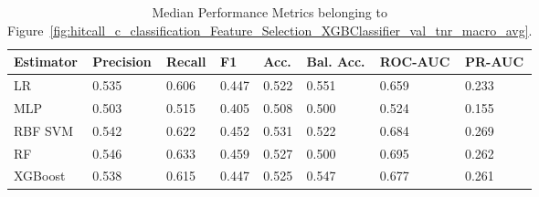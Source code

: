 \begin{longtable}{llllllll}
\caption{Median Performance Metrics belonging to Figure~\ref{fig:hitcall_c_classification_Feature_Selection_XGBClassifier_val_tnr_macro_avg}.}\label{tab:table:hitcall_c_classification_feature_selection_xgbclassifier_val_tnr_macro_avg}\\
\toprule
\midrule
\small Estimator & \small Precision & \small Recall & \small F1 & \small Acc. & \small Bal. Acc. & \small ROC-AUC & \small PR-AUC\\
\hline
LR & 0.535 & 0.606 & 0.447 & 0.522 & 0.551 & 0.659 & 0.233\\
MLP & 0.503 & 0.515 & 0.405 & 0.508 & 0.500 & 0.524 & 0.155\\
RBF SVM & 0.542 & 0.622 & 0.452 & 0.531 & 0.522 & 0.684 & 0.269\\
RF & 0.546 & 0.633 & 0.459 & 0.527 & 0.500 & 0.695 & 0.262\\
XGBoost & 0.538 & 0.615 & 0.447 & 0.525 & 0.547 & 0.677 & 0.261\\
\bottomrule
\end{longtable}